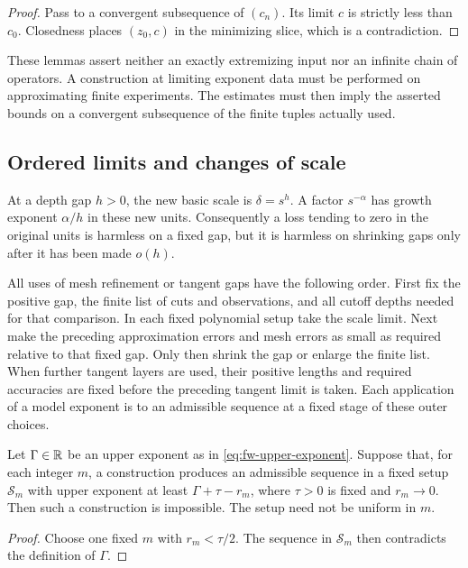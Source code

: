 \begin{proof}
Pass to a convergent subsequence of $(c_n)$.  Its limit $c$ is strictly
less than $c_0$.  Closedness places $(z_0,c)$ in the minimizing slice,
which is a contradiction.
\end{proof}

These lemmas assert neither an exactly extremizing input nor an
infinite chain of operators.  A construction at limiting exponent
data must be performed on approximating finite experiments.  The
estimates must then imply the asserted bounds on a convergent
subsequence of the finite tuples actually used.

\subsection{Ordered limits and changes of scale}

At a depth gap $h>0$, the new basic scale is $\delta=s^h$.  A factor
$s^{-\alpha}$ has growth exponent $\alpha/h$ in these new units.
Consequently a loss tending to zero in the original units is harmless
on a fixed gap, but it is harmless on shrinking gaps only after it has
been made $o(h)$.

All uses of mesh refinement or tangent gaps have the following order.
First fix the positive gap, the finite list of cuts and observations,
and all cutoff depths needed for that comparison.  In each fixed
polynomial setup take the scale limit.  Next make the preceding
approximation errors and mesh errors as small as required relative
to that fixed gap.  Only then shrink the gap or enlarge the finite
list.  When further tangent layers are used, their positive lengths
and required accuracies are fixed before the preceding tangent limit
is taken.  Each application of a model exponent is to an admissible
sequence at a fixed stage of these outer choices.

\begin{lemma}
\label{lem:fw-pullback}
Let $\Gamma\in\mathbb R$ be an upper exponent as in
\eqref{eq:fw-upper-exponent}.  Suppose that, for each integer $m$, a
construction produces an admissible sequence in a fixed setup
$\mathscr S_m$ with upper exponent at least
$\Gamma+\tau-r_m$, where $\tau>0$ is fixed and $r_m\to0$.
Then such a construction is impossible.  The setup need not be
uniform in $m$.
\end{lemma}

\begin{proof}
Choose one fixed $m$ with $r_m<\tau/2$.  The sequence in
$\mathscr S_m$ then contradicts the definition of $\Gamma$.
\end{proof}

